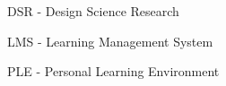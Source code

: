 DSR - Design Science Research

LMS - Learning Management System

PLE - Personal Learning Environment

